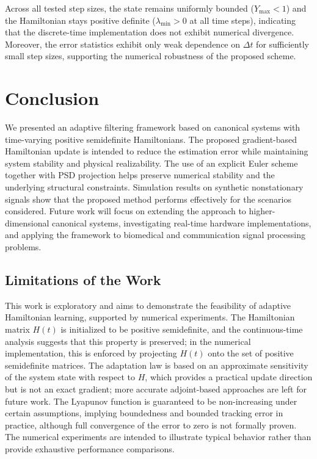 \documentclass[reqno]{amsart}
\numberwithin{equation}{section}
\begin{document}
Across all tested step sizes, the state remains uniformly bounded ($Y_{\max}<1$) and the Hamiltonian stays positive definite
($\lambda_{\min}>0$ at all time steps), indicating that the discrete-time implementation does not exhibit numerical divergence.
Moreover, the error statistics exhibit only weak dependence on $\Delta t$ for sufficiently small step sizes, supporting the
numerical robustness of the proposed scheme.

 \section{Conclusion}
We presented an adaptive filtering framework based on canonical systems with time-varying positive semidefinite Hamiltonians. The proposed gradient-based Hamiltonian update is intended to reduce the estimation error while maintaining system stability and physical realizability. The use of an explicit Euler scheme together with PSD projection helps preserve numerical stability and the underlying structural constraints. Simulation results on synthetic nonstationary signals show that the proposed method performs effectively for the scenarios considered. Future work will focus on extending the approach to higher-dimensional canonical systems, investigating real-time hardware implementations, and applying the framework to biomedical and communication signal processing problems.

\subsection*{Limitations of the Work}
This work is exploratory and aims to demonstrate the feasibility of adaptive Hamiltonian learning, supported by numerical experiments. The Hamiltonian matrix $H(t)$ is initialized to be positive semidefinite, and the continuous-time analysis suggests that this property is preserved; in the numerical implementation, this is enforced by projecting $H(t)$ onto the set of positive semidefinite matrices. The adaptation law is based on an approximate sensitivity of the system state with respect to $H$, which provides a practical update direction but is not an exact gradient; more accurate adjoint-based approaches are left for future work. The Lyapunov function is guaranteed to be non-increasing under certain assumptions, implying boundedness and bounded tracking error in practice, although full convergence of the error to zero is not formally proven. The numerical experiments are intended to illustrate typical behavior rather than provide exhaustive performance comparisons.\\
\end{document}
